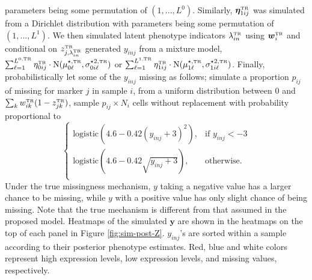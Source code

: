 \documentclass[12pt,]{article}
\newcommand{\p}[1]{\left(#1\right)}
\newcommand{\N}{ \mathcal{N} }
\def\beginmyfig{\begin{figure}[H]\center}
\def\endmyfig{\end{figure}}
\def\bet{\bm{\eta}}
\def\N{\text{N}}
\def\y{\bm{y}}
\newcommand{\true}{{\mbox{\tiny TR}}}
\newcommand{\bw}{\mbox{\boldmath $w$}}
\def\beginmyfig{\begin{figure}[H]\center}
\def\endmyfig{\end{figure}}
\begin{document}
parameters being some permutation of $(1,...,L^0)$. Similarly, 
$\bet_{1ij}^\true$ was simulated from a Dirichlet distribution with
parameters being some permutation of $(1,...,L^1)$.
%
We then simulated latent phenotype indicators $\lambda_{in}^\true$ using
$\bw_i^\true$ and conditional on $z^\true_{j,\lambda_{in}^\true}$ generated
$y_{inj}$ from a mixture model, $\sum_{\ell=1}^{L^{0,\true}}
\eta^\true_{0ij}\cdot\N(\mu^{\star, \true}_{0\ell}, \sigma^{\star 2,
\true}_{0i\ell})$ or $\sum_{\ell=1}^{L^{1,\true}}
\eta^\true_{1ij}\cdot\N(\mu^{\star, \true}_{1\ell}, \sigma^{\star 2,
\true}_{1i\ell})$.   Finally, probabilistically let some of the $y_{inj}$
missing as follows; simulate a proportion $p_{ij}$ of missing for marker
$j$ in sample $i$, from a uniform distribution between 0 and  $\sum_k
w^\true_{ik}(1-z^\true_{jk})$, sample $p_{ij}\times N_i$ cells without
replacement with probability proportional to
$$
\begin{cases}
  \text{logistic}\p{4.6 - 0.42(y_{inj}+3)^2}, & \text{if } y_{inj} < -3 \\
  \text{logistic}\p{4.6 - 0.42\sqrt{y_{inj}+3}}, & \text{otherwise.} \\
\end{cases}
$$
%
Under the true missingness mechanism, $y$ taking a negative value has a larger
chance to be missing, while $y$ with a positive value has only slight chance of
being missing.  Note that the true mechanism is different from that assumed in
the proposed model.   
Heatmaps of the simulated $\y$ are shown in the heatmaps on the top of each
panel in Figure \ref{fig:sim-post-Z}. $y_{inj}$'s are sorted within a sample
according to their posterior phenotype estimates.  Red, blue and white colors
represent high expression levels, low expression levels, and missing values,
respectively.

\end{document}
